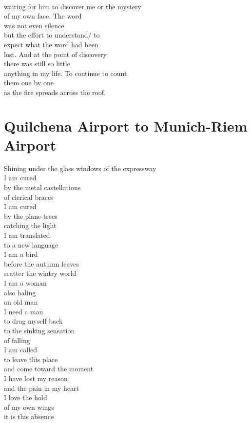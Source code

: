\documentclass[smalldemyvopaper,11pt,twoside,onecolumn,openright,extrafontsizes]{memoir}
\begin{document}
\\waiting for him to discover me or the mystery
\\of my own face.   The word
\\was not even silence
\\but the effort to understand/ to
\\expect what the word had been
\\lost.   And at the point of discovery
\\there was still so little
\\anything in my life.   To continue to count
\\them one by one
\\as the fire spreads across the roof.



\chapter{Quilchena Airport to Munich-Riem Airport}
Shining under the glass windows of the expressway
\\I am cured
\\by the metal castellations
\\of clerical braces
\\I am cured
\\by the plane-trees
\\catching the light
\\I am translated
\\to a new language
\\I am a bird
\\before the autumn leaves
\\scatter the wintry world
\\I am a woman
\\also haling
\\an old man
\\I need a man
\\to drag myself back
\\to the sinking sensation
\\of falling
\\I am called
\\to leave this place
\\and come toward the moment
\\I have lost my reason
\\and the pain in my heart
\\I love the hold
\\of my own wings
\\it is this absence
\end{document}
